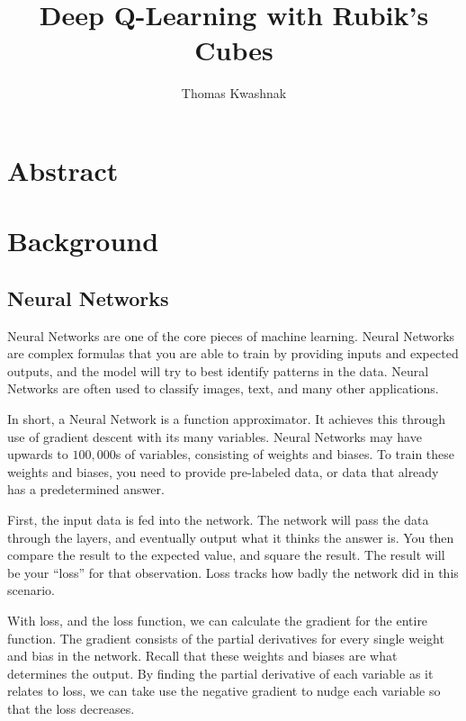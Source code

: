 \documentclass[12pt]{article}
\title{Deep Q-Learning with Rubik's Cubes}
\author{Thomas Kwashnak}
\begin{document}
\begin{titlepage}

	\maketitle

\end{titlepage}

\tableofcontents
\newpage


\section{Abstract}

\newpage

\section{Background}

\subsection{Neural Networks}

Neural Networks are one of the core pieces of machine learning. Neural Networks are complex formulas that you are able to train by providing inputs and expected outputs, and the model will try to best identify patterns in the data. Neural Networks are often used to classify images, text, and many other applications.

In short, a Neural Network is a function approximator. It achieves this through use of gradient descent with its many variables. Neural Networks may have upwards to $100,000$s of variables, consisting of weights and biases. To train these weights and biases, you need to provide pre-labeled data, or data that already has a predetermined answer.

First, the input data is fed into the network. The network will pass the data through the layers, and eventually output what it thinks the answer is. You then compare the result to the expected value, and square the result. The result will be your ``loss'' for that observation. Loss tracks how badly the network did in this scenario.

With loss, and the loss function, we can calculate the gradient for the entire function. The gradient consists of the partial derivatives for every single weight and bias in the network. Recall that these weights and biases are what determines the output. By finding the partial derivative of each variable as it relates to loss, we can take use the negative gradient to nudge each variable so that the loss decreases.
\end{document}

